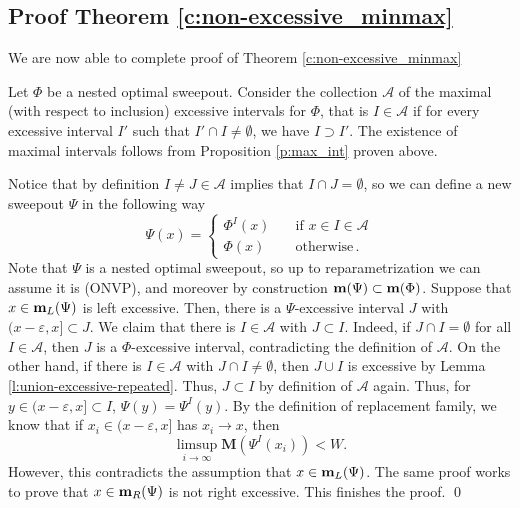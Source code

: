 \documentclass[12pt,twoside]{amsart}
\numberwithin{equation}{section}
\newcommand{\cA}{\mathcal A}
\newcommand{\mm}{{\bf m}}
\newcommand{\bM}{\mathbf{M}}
\newcommand{\eps}{\varepsilon}
\begin{document}
\subsection{Proof Theorem \ref{c:non-excessive_minmax}}
We are now able to complete proof of Theorem \ref{c:non-excessive_minmax}

		Let $\Phi$ be a nested optimal sweepout. Consider the collection $\cA$ of the maximal (with respect to inclusion) excessive intervals for $\Phi$, that is $I\in \cA$ if for every excessive interval $I'$ such that $I'\cap I\neq \emptyset$, we have $I\supset I'$. The existence of maximal intervals follows from Proposition \ref{p:max_int} proven above. 
	
	    Notice that by definition $I \neq J\in \cA$ implies that $I\cap J=\emptyset$, so we can define a new sweepout $\Psi$ in the following way
\[
	    \Psi(x)=\begin{cases}
	    \Phi^I(x) & \quad \text{if }x \in I \in \cA\\
	    \Phi(x) & \quad \text{otherwise}\,.
	    \end{cases}
\]
Note that $\Psi$ is a nested optimal sweepout, so up to reparametrization we can assume it is (ONVP), and moreover by construction $\mm(\Psi)\subset \mm(\Phi)$. Suppose that $x \in \mm_L(\Psi)$ is left excessive. Then, there is a $\Psi$-excessive interval $J$ with $(x-\eps,x]\subset J$. We claim that there is $I \in \cA$ with $J \subset I$. Indeed, if $J \cap I = \emptyset$ for all $I \in \cA$, then $J$ is a $\Phi$-excessive interval, contradicting the definition of $\cA$. On the other hand, if there is $I \in \cA$ with $J \cap I \not =\emptyset$, then $J \cup I$ is excessive by Lemma \ref{l:union-excessive-repeated}. Thus, $J \subset I$ by definition of $\cA$ again. Thus, for $y \in (x-\eps,x]\subset I$, $\Psi(y) = \Psi^I(y)$. By the definition of replacement family, we know that if $x_i \in (x-\eps,x]$ has $x_i\to x$, then
\[
\limsup_{i\to\infty} \bM(\Psi^I(x_i)) < W. 
\]
However, this contradicts the assumption that $x \in\mm_L(\Psi)$. The same proof works to prove that $x \in \mm_R(\Psi)$ is not right excessive. This finishes the proof. \qed
\end{document}
